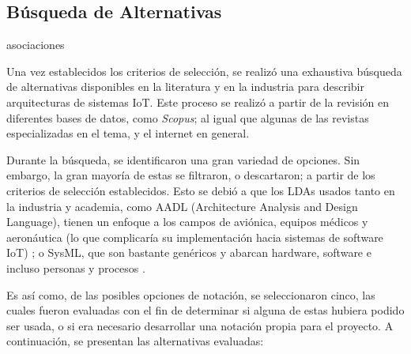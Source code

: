 
\subsection{Búsqueda de Alternativas}

asociaciones

Una vez establecidos los criterios de selección, se realizó una exhaustiva búsqueda de alternativas disponibles en la literatura y en la industria para describir arquitecturas de sistemas IoT. Este proceso se realizó a partir de la revisión en diferentes bases de datos, como \textit{Scopus}; al igual que algunas de las revistas especializadas en el tema, y el internet en general.

Durante la búsqueda, se identificaron una gran variedad de opciones. Sin embargo, la gran mayoría de estas se filtraron, o descartaron; a partir de los criterios de selección establecidos. Esto se debió a que los LDAs usados tanto en la industria y academia, como AADL (Architecture Analysis and Design Language), tienen un enfoque a los campos de aviónica, equipos médicos y aeronáutica (lo que complicaría su implementación hacia sistemas de software IoT) \cite{aadl_web, aadl_pdf}; o SysML, que son bastante genéricos y abarcan hardware, software e incluso personas y procesos \cite{omgsysml_2015}.

Es así como, de las posibles opciones de notación, se seleccionaron cinco, las cuales fueron evaluadas con el fin de determinar si alguna de estas hubiera podido ser usada, o si era necesario desarrollar una notación propia para el proyecto. A continuación, se presentan las alternativas evaluadas:

